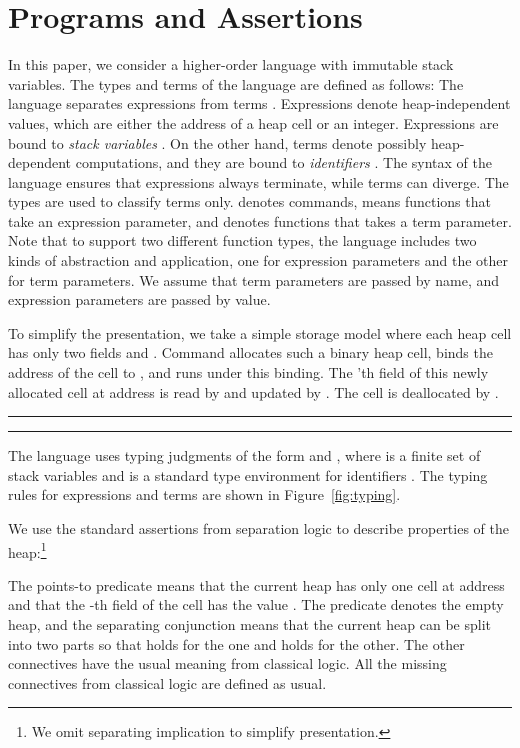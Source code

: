 \documentclass{LMCS}
\begin{document}
\section{Programs and Assertions}
\label{sec:programs-and-assertions}
In this paper, we consider a 
higher-order language with immutable stack variables.
The types and terms of the language are defined as follows:
{
}
The language separates expressions  from terms .
Expressions denote heap-independent values, which
are either the address of a heap cell or an integer.
Expressions are bound to 
{\em stack variables} . On the other hand,
terms denote possibly heap-dependent computations,
 and  they
are bound to {\em identifiers} . The syntax
of the language ensures that expressions always
terminate, while terms can diverge. The types are
used to classify terms only.  denotes commands, 
 means functions
that take an expression parameter, and
 denotes functions that
takes a term parameter. Note that to support
two different function types, the language
includes two kinds of abstraction and application,
one for expression parameters and the other for term 
parameters. We assume that term parameters are
passed by name, and expression parameters are
passed by value.

To simplify the presentation, we take a simple storage
model where each heap cell has only two fields  and .
Command 
 allocates such a binary heap cell, binds the 
address of the cell to , and runs  under this binding.
The 'th field of this newly allocated cell at address  is read by
 and updated by
. The cell  is deallocated by .

\begin{figure*}[t]
\hrule



\hrule
\caption{Typing Rules for Expressions and Terms}
\label{fig:typing}
\end{figure*}


The language uses typing judgments of the form
 and
,
where  is a finite set of stack variables
and  is a standard type environment for identifiers .
The typing rules for expressions and terms are shown in
Figure~\ref{fig:typing}.


We use the standard assertions from separation logic to describe properties
of the heap:\footnote{We omit separating implication 
to simplify presentation.}
{

}
The points-to predicate  means
that the current heap has only one cell at address  and 
that the -th field of the cell has the value .
The  predicate denotes the empty heap, and the separating
conjunction  means that the current heap can be split into
two parts so that  holds for the one and  holds for the other.
The other connectives have the usual meaning from classical logic.
All the missing connectives from classical logic are defined as usual. 
\end{document}
